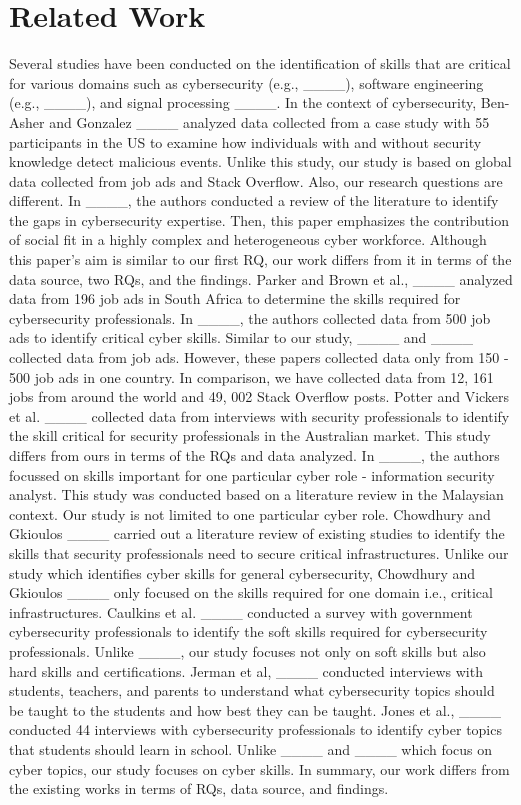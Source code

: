 \section{Related Work}
\label{RW}

Several studies have been conducted on the identification of skills that are critical for various domains such as cybersecurity (e.g., ____), software engineering (e.g., ____), and signal processing ____. In the context of cybersecurity, Ben-Asher and Gonzalez ____ analyzed data collected from a case study with 55 participants in the US to examine how individuals with and without security knowledge detect malicious events. Unlike this study, our study is based on global data collected from job ads and Stack Overflow. Also, our research questions are different. In ____, the authors conducted a review of the literature to identify the gaps in cybersecurity expertise. Then, this paper emphasizes the contribution of social fit in a highly complex and heterogeneous cyber workforce. Although this paper's aim is similar to our first RQ, our work differs from it in terms of the data source, two RQs, and the findings. Parker and Brown et al., ____ analyzed data from 196 job ads in South Africa to determine the skills required for cybersecurity professionals. In ____, the authors collected data from 500 job ads to identify critical cyber skills. Similar to our study,  ____ and ____ collected data from job ads. However, these papers collected data only from 150 - 500 job ads in one country. In comparison, we have collected data from 12, 161 jobs from around the world and 49, 002 Stack Overflow posts. 
\smallbreak
Potter and Vickers et al. ____ collected data from interviews with security professionals to identify the skill critical for security professionals in the Australian market. This study differs from ours in terms of the RQs and data analyzed. In ____, the authors focussed on skills important for one particular cyber role - information security analyst. This study was conducted based on a literature review in the Malaysian context. Our study is not limited to one particular cyber role. Chowdhury and Gkioulos ____ carried out a literature review of existing studies to identify the skills that security professionals need to secure critical infrastructures. Unlike our study which identifies cyber skills for general cybersecurity, Chowdhury and Gkioulos ____ only focused on the skills required for one domain i.e., critical infrastructures. Caulkins et al. ____ conducted a survey with government cybersecurity professionals to identify the soft skills required for cybersecurity professionals. Unlike ____, our study focuses not only on soft skills but also hard skills and certifications. Jerman et al, ____ conducted interviews with students, teachers, and parents to understand what cybersecurity topics should be taught to the students and how best they can be taught. Jones et al., ____ conducted 44 interviews with cybersecurity professionals to identify cyber topics that students should learn in school. Unlike ____ and ____ which focus on cyber topics, our study focuses on cyber skills. In summary, our work differs from the existing works in terms of RQs, data source, and findings.